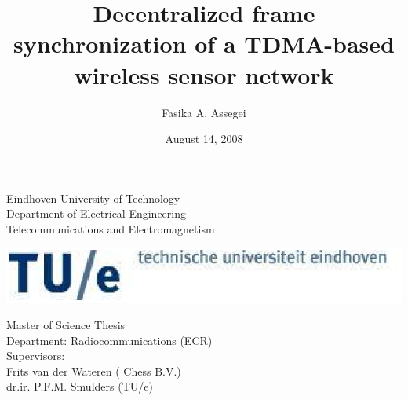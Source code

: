 \documentclass[a4paper,10pt]{report}
\title{\textbf{Decentralized frame synchronization of a TDMA-based wireless sensor network}}
\author{Fasika A. Assegei}
\date{August 14, 2008}
\begin{document}
\pagestyle{empty}
\begin{titlepage}
\begin{center}
\parbox{27cm}{
  \hspace{1cm}
  \begin{minipage}[c]{.6\textwidth}
    Eindhoven University of Technology\\
    Department of Electrical Engineering\\
    Telecommunications and Electromagnetism
  \end{minipage}
   \begin{minipage}[c]{.4\textwidth}
    \includegraphics[scale=0.5]{TUElogoCompact2}
  \end{minipage}
}
\end{center}

\begin{center}
\hspace{2cm}
\begin{minipage}[c]{16cm}
    \vspace{2.5cm}
    \centering
    \Large
    \maketitle
    \vspace{4cm}
\end{minipage}
\end{center}
\hspace{1cm}
\begin{minipage}[b]{16cm}
    Master of Science Thesis\\
    Department: Radiocommunications (ECR)\\
    Supervisors:\\
    Frits van der Wateren ( Chess B.V.) \\
    dr.ir. P.F.M. Smulders (TU/e) \\
\end{minipage}
\end{titlepage}
\end{document}
